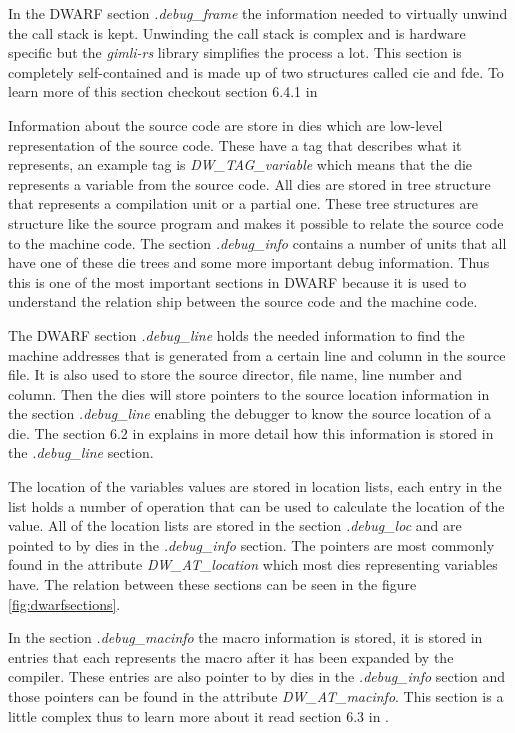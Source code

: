 In the \gls{DWARF} section \emph{.debug\_frame} the information needed to virtually unwind the call stack is kept.
Unwinding the call stack is complex and is hardware specific but the \emph{gimli-rs} library simplifies the process a lot.
This section is completely self-contained and is made up of two structures called \acrfull{cie} and \acrfull{fde}.
To learn more of this section checkout section 6.4.1 in \cite{dwarf}


Information about the source code are store in \glspl{die} which are low-level representation of the source code.
These have a tag that describes what it represents, an example tag is \emph{DW\_TAG\_variable} which means that the \gls{die} represents a variable from the source code.
All \glspl{die} are stored in \gls{tree} structure that represents a compilation unit or a partial one.
These \gls{tree} structures are structure like the source program and makes it possible to relate the source code to the machine code.
The section \emph{.debug\_info} contains a number of units that all have one of these \gls{die} \glspl{tree} and some more important debug information.
Thus this is one of the most important sections in \gls{DWARF} because it is used to understand the relation ship between the source code and the machine code.


The \gls{DWARF} section \emph{.debug\_line} holds the needed information to find the machine addresses that is generated from a certain line and column in the source file.
It is also used to store the source director, file name, line number and column.
Then the \glspl{die} will store pointers to the source location information in the section \emph{.debug\_line} enabling the debugger to know the source location of a \gls{die}.
The section 6.2 in \cite{dwarf} explains in more detail how this information is stored in the \emph{.debug\_line} section.


The location of the variables values are stored in location lists, each entry in the list holds a number of operation that can be used to calculate the location of the value.
All of the location lists are stored in the section \emph{.debug\_loc} and are pointed to by \glspl{die} in the \emph{.debug\_info} section.
The pointers are most commonly found in the attribute \emph{DW\_AT\_location} which most dies representing variables have.
The relation between these sections can be seen in the figure \ref{fig:dwarfsections}.


In the section \emph{.debug\_macinfo} the macro information is stored, it is stored in entries that each represents the macro after it has been expanded by the compiler.
These entries are also pointer to by \glspl{die} in the \emph{.debug\_info} section and those pointers can be found in the attribute \emph{DW\_AT\_macinfo}.
This section is a little complex thus to learn more about it read section 6.3 in \cite{dwarf}.


